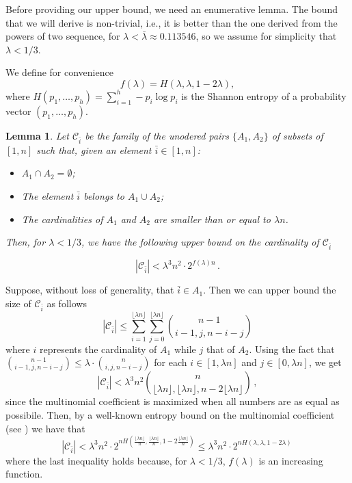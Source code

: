 \documentclass[a4paper]{amsart}
\theoremstyle{plain}
\newtheorem{Lemma}[Definition]{Lemma}
\begin{document}
Before providing our upper bound, we need an enumerative lemma.
The bound that we will derive is non-trivial,  i.e.,  it is better than the one derived from the powers of two sequence,  for $\lambda < \bar{\lambda} \approx 0.113546$,  so we assume for simplicity that $\lambda<1/3$.

We define for convenience
$$
f(\lambda) = H(\lambda, \lambda, 1-2\lambda),
$$
where $H(p_1, \ldots, p_h) = \sum_{i=1}^h - p_i \log p_i$ is the Shannon entropy of a probability vector $(p_1, \ldots, p_h)$.

\begin{Lemma}\label{Stima2}
Let $\mathcal{C}_{\bar{i}}$ be the family of the unodered pairs $\{A_1,A_2\}$ of subsets of $[1,n]$ such that, given an element $\bar{i}\in [1,n]$:
\begin{itemize}
\item $A_1\cap A_2=\emptyset$;
\item The element $\bar{i}$ belongs to $A_1\cup A_2$;
\item The cardinalities of $A_1$ and $A_2$ are smaller than or equal to $\lambda n$.
\end{itemize}
Then, for $\lambda<1/3$, we have the following upper bound on the cardinality of $\mathcal{C}_{\bar{i}}$

\begin{equation*}\label{eq:multibound}
|\mathcal{C}_{\bar{i}}| < \lambda^3 n^2 \cdot 2^{ f(\lambda) n}\,.
\end{equation*}
\end{Lemma}
\proof
Suppose, without loss of generality, that $\bar{i} \in A_1$. Then we can upper bound the size of $\mathcal{C}_{\bar{i}}$ as follows
$$
|\mathcal{C}_{\bar{i}}| \leq \sum_{i=1}^{\lfloor\lambda n\rfloor} \sum_{j=0}^{\lfloor\lambda n\rfloor} \binom{n-1}{i-1, j, n-i-j}
$$
where $i$ represents the cardinality of $A_1$ while $j$ that of $A_2$. Using the fact that $\binom{n-1}{i-1, j, n-i-j} \leq \lambda \cdot \binom{n}{i, j, n-i-j}$ for each $i \in [1, \lambda n]$ and $j \in [0, \lambda n]$, we get
\begin{equation*}
|\mathcal{C}_{\bar{i}}| < \lambda^3 n^2 \binom{n}{\lfloor\lambda n\rfloor, \lfloor\lambda n\rfloor, n-2\lfloor\lambda n\rfloor}\,,
\end{equation*}
since the multinomial coefficient is maximized when all numbers are as equal as possibile.
Then, by a well-known entropy bound on the multinomial coefficient (see \cite[Lemma 2.2]{Csiszar}) we have that
\begin{equation*}
|\mathcal{C}_{\bar{i}}| < \lambda^3 n^2 \cdot 2^{n H(\frac{\lfloor\lambda n\rfloor}{n}, \frac{\lfloor\lambda n\rfloor}{n}, 1-2 \frac{\lfloor\lambda n\rfloor}{n})}\leq \lambda^3 n^2 \cdot 2^{n H(\lambda, \lambda, 1-2 \lambda)}\,
\end{equation*}
where the last inequality holds because, for $\lambda < 1/3$, $f(\lambda)$ is an increasing function.
\endproof
\end{document}

